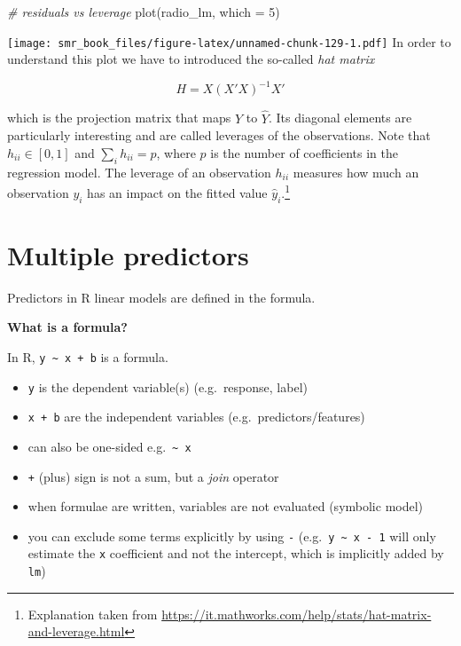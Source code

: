 \documentclass[
  oneside]{book}
\newenvironment{Shaded}{\begin{snugshade}}{\end{snugshade}}
\newcommand{\AttributeTok}[1]{\textcolor[rgb]{0.77,0.63,0.00}{#1}}
\newcommand{\CommentTok}[1]{\textcolor[rgb]{0.56,0.35,0.01}{\textit{#1}}}
\newcommand{\DecValTok}[1]{\textcolor[rgb]{0.00,0.00,0.81}{#1}}
\newcommand{\FunctionTok}[1]{\textcolor[rgb]{0.00,0.00,0.00}{#1}}
\newcommand{\NormalTok}[1]{#1}
\providecommand{\tightlist}{%
  \setlength{\itemsep}{0pt}\setlength{\parskip}{0pt}}
\begin{document}
\begin{Shaded}
\begin{Highlighting}[]
\CommentTok{\# residuals vs leverage}
\FunctionTok{plot}\NormalTok{(radio\_lm, }\AttributeTok{which =} \DecValTok{5}\NormalTok{)}
\end{Highlighting}
\end{Shaded}

\texttt{[image: smr\_book\_files/figure-latex/unnamed-chunk-129-1.pdf]}
In order to understand this plot we have to introduced the
so-called \emph{hat matrix}

\[
H = X (X'X)^{-1} X'
\]

which is the projection matrix that maps \(Y\) to \(\hat Y\).
Its diagonal elements are particularly interesting and are called
leverages of the observations. Note that \(h_{ii} \in [0,1]\) and
\(\sum_i h_{ii} = p\), where \(p\) is the number of coefficients in the regression model.
The leverage of an observation \(h_{ii}\) measures how much an observation \(y_i\)
has an impact on the fitted value \(\hat y_i\).\footnote{Explanation taken from
  \url{https://it.mathworks.com/help/stats/hat-matrix-and-leverage.html}}

\hypertarget{multiple-predictors}{%
\section{Multiple predictors}\label{multiple-predictors}}

Predictors in R linear models are defined in the formula.

\textbf{What is a formula?}

In R, \texttt{y\ \textasciitilde{}\ x\ +\ b} is a formula.

\begin{itemize}
\tightlist
\item
  \texttt{y} is the dependent variable(s) (e.g.~response, label)
\item
  \texttt{x\ +\ b} are the independent variables (e.g.~predictors/features)
\item
  can also be one-sided e.g.~\texttt{\textasciitilde{}\ x}
\item
  \texttt{+} (plus) sign is not a sum, but a \emph{join} operator
\item
  when formulae are written, variables are not evaluated (symbolic model)
\item
  you can exclude some terms explicitly by using \texttt{-} (e.g.~\texttt{y\ \textasciitilde{}\ x\ -\ 1}
  will only estimate the \texttt{x} coefficient and not the intercept, which
  is implicitly added by \texttt{lm})
\end{itemize}
\end{document}
